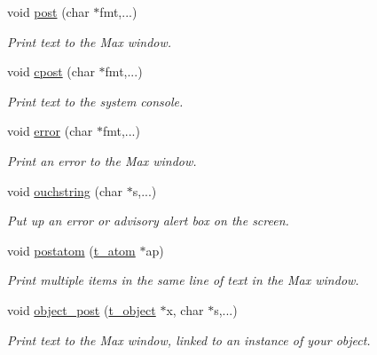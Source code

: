 \begin{DoxyCompactItemize}
\item 
void \hyperlink{group__console_ga3714108f42b44384b4d58009eafc1806}{post} (char $\ast$fmt,...)
\begin{DoxyCompactList}\small\item\em Print text to the Max window. \item\end{DoxyCompactList}\item 
void \hyperlink{group__console_ga94fff7e4ee19b8db6904a009117e0667}{cpost} (char $\ast$fmt,...)
\begin{DoxyCompactList}\small\item\em Print text to the system console. \item\end{DoxyCompactList}\item 
void \hyperlink{group__console_gaa7733e30b2951f225e24dca1ed4632b2}{error} (char $\ast$fmt,...)
\begin{DoxyCompactList}\small\item\em Print an error to the Max window. \item\end{DoxyCompactList}\item 
void \hyperlink{group__console_ga4cba33c91c6a8aa3d886e746e04f21af}{ouchstring} (char $\ast$s,...)
\begin{DoxyCompactList}\small\item\em Put up an error or advisory alert box on the screen. \item\end{DoxyCompactList}\item 
void \hyperlink{group__console_gaef84325d992e0afa14b2e7b0c0515601}{postatom} (\hyperlink{structt__atom}{t\_\-atom} $\ast$ap)
\begin{DoxyCompactList}\small\item\em Print multiple items in the same line of text in the Max window. \item\end{DoxyCompactList}\item 
void \hyperlink{group__console_gafb92b17363269d4d26de1823cbc2492d}{object\_\-post} (\hyperlink{structt__object}{t\_\-object} $\ast$x, char $\ast$s,...)
\begin{DoxyCompactList}\small\item\em Print text to the Max window, linked to an instance of your object. \item\end{DoxyCompactList}\item 

\end{DoxyCompactItemize}
